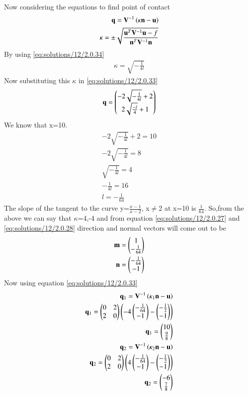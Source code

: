 Now considering the equations to find point of contact
\begin{align} \mathbf{q} = \mathbf{V}^{-1}\left(\kappa \mathbf{n}-\mathbf{u}\right)\label{eq:solutions/12/2.0.33}
\\
\kappa = \pm \sqrt{\frac{\mathbf{u}^T\mathbf{V}^{-1}\mathbf{u}-f}{\mathbf{n}^T\mathbf{V}^{-1}\mathbf{n}}} \label{eq:solutions/12/2.0.34}
\end{align}
By using \eqref{eq:solutions/12/2.0.34}
\begin{align}
\kappa=\sqrt{-\frac{1}{4l}}
\end{align}
Now substituting this $\kappa$ in \eqref{eq:solutions/12/2.0.33}
\begin{align}
\mathbf{q}=\begin{pmatrix}-2\sqrt{-\frac{1}{4l}}+2\\2\sqrt{\frac{-l}{4}}+1\end{pmatrix}
\end{align}
We know that x=10.
\begin{align}
-2\sqrt{-\frac{1}{4l}}+2=10\\
-2\sqrt{-\frac{1}{4l}}=8\\
\sqrt{-\frac{1}{4l}}=4\\
-\frac{1}{4l}=16\\
l=-\frac{1}{64}
\end{align}
The slope of the tangent to the curve y=$\frac{x-1}{x-2}$, x$\not=$2 at x=10 is $\frac{1}{64}$.
So,from the above we can say that $\kappa$=4,-4 and from equation \eqref{eq:solutions/12/2.0.27} and \eqref{eq:solutions/12/2.0.28} direction and normal vectors will come out to be
\begin{align}
\mathbf{m}=\begin{pmatrix}1\\-\frac{1}{64}\end{pmatrix}\\
\mathbf{n}=\begin{pmatrix}-\frac{1}{64}\\-1\end{pmatrix}
\end{align}
Now using equation \eqref{eq:solutions/12/2.0.33}
\begin{align}
\mathbf{q}_1 = \mathbf{V}^{-1}\left(\kappa_1 \mathbf{n}-\mathbf{u}\right)\\
\mathbf{q}_1 = \begin{pmatrix}0&2\\2&0\end{pmatrix}\left(-4 \begin{pmatrix}-\frac{1}{64}\\-1\end{pmatrix}-\begin{pmatrix}-\frac{1}{2}\\-1\end{pmatrix}\right)\\
\mathbf{q}_1=\begin{pmatrix}10\\ \frac{9}{8}\end{pmatrix}\\
\mathbf{q}_2 = \mathbf{V}^{-1}\left(\kappa_2 \mathbf{n}-\mathbf{u}\right)\\
\mathbf{q}_2 = \begin{pmatrix}0&2\\2&0\end{pmatrix}\left(4 \begin{pmatrix}-\frac{1}{64}\\-1\end{pmatrix}-\begin{pmatrix}-\frac{1}{2}\\-1\end{pmatrix}\right)\\
\mathbf{q}_2=\begin{pmatrix}-6\\ \frac{7}{8}\end{pmatrix}
\end{align}
